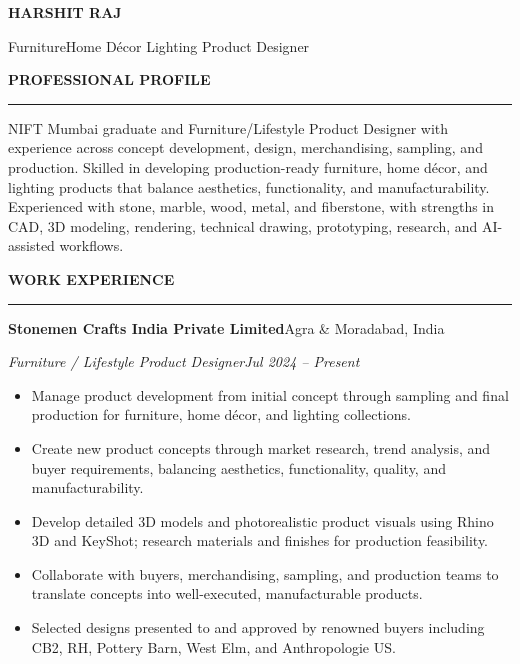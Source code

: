 \documentclass[a4paper]{article}
\newlength{\mainwidth}\setlength{\mainwidth}{14cm}
\newlength{\mainpad}\setlength{\mainpad}{0.6cm}
\newcommand{\mainsec}[1]{%
  \vspace{9pt}%
  {\fontsize{10.5}{12}\selectfont\bfseries\color{accent}%
   \MakeUppercase{#1}}\par\nobreak
  \vspace{1.5pt}%
  {\color{rulecolor}\rule{\linewidth}{0.3pt}}\par\nobreak
  \vspace{4pt}%
}
\newcommand{\entry}[4]{%
  \par\vspace{3pt}%
  {\small\textbf{#1}\hfill#2}\par\nobreak
  {\small\itshape\color{subtext}#3\hfill#4}\par\nobreak
  \vspace{1pt}%
}
\newcommand{\blt}[1]{\item\small #1}
\begin{document}
\begin{minipage}[t][\paperheight]{\mainwidth}%
\hspace{\mainpad}%
\begin{minipage}[t]{\dimexpr\mainwidth-2\mainpad\relax}%
\vspace{0.55cm}

{\fontsize{26}{30}\selectfont\bfseries\color{accent}HARSHIT RAJ}\par
\vspace{3pt}
{\fontsize{11}{14}\selectfont\color{subtext}%
  Furniture\;\textbar\;Home D\'{e}cor\;\textbar\;%
  Lighting Product Designer}\par

\mainsec{Professional Profile}
\small
NIFT Mumbai graduate and Furniture/Lifestyle Product Designer with
experience across concept development, design, merchandising, sampling,
and production. Skilled in developing production-ready furniture,
home d\'{e}cor, and lighting products that balance aesthetics,
functionality, and manufacturability. Experienced with stone, marble,
wood, metal, and fiberstone, with strengths in CAD, 3D modeling,
rendering, technical drawing, prototyping, research, and AI-assisted
workflows.

\mainsec{Work Experience}

\entry{Stonemen Crafts India Private Limited}{Agra \& Moradabad, India}
      {Furniture / Lifestyle Product Designer}{Jul 2024 -- Present}
\begin{itemize}[leftmargin=0.14in,itemsep=0pt,topsep=1pt,parsep=0pt]
  \blt{Manage product development from initial concept through sampling
    and final production for furniture, home d\'{e}cor, and lighting
    collections.}
  \blt{Create new product concepts through market research, trend
    analysis, and buyer requirements, balancing aesthetics, functionality,
    quality, and manufacturability.}
  \blt{Develop detailed 3D models and photorealistic product visuals
    using Rhino 3D and KeyShot; research materials and finishes for
    production feasibility.}
  \blt{Collaborate with buyers, merchandising, sampling, and production
    teams to translate concepts into well-executed, manufacturable
    products.}
  \blt{Selected designs presented to and approved by renowned buyers
    including CB2, RH, Pottery Barn, West Elm, and Anthropologie US.}
\end{itemize}


\end{minipage}
\end{minipage}
\end{document}
